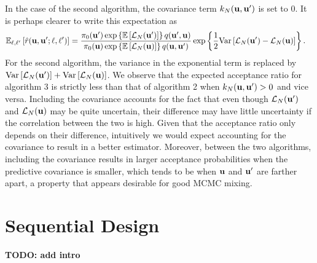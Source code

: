 \documentclass[12pt]{article}
\begin{document}
In the case of the second algorithm, the covariance term $\GPKerPred[\Ndesign](\bpar, \bpar^\prime)$ is set to $0$. It is perhaps clearer to write this expectation as 
\begin{align*}
\E_{\ell, \ell^\prime}\left[\hat{r}(\bpar, \bpar^\prime; \ell, \ell^\prime)\right]
&= \frac{\priorDens(\bpar^\prime)\exp\left\{\E\left[\llik_{\Ndesign}(\bpar^\prime)\right] \right\} \propDens(\bpar^\prime, \bpar)}{\priorDens(\bpar) \exp\left\{\E\left[\llik_{\Ndesign}(\bpar)\right]\right\} \propDens(\bpar, \bpar^\prime)}
\exp\left\{\frac{1}{2}\Var\left[\llik_{\Ndesign}(\bpar^\prime) -  \llik_{\Ndesign}(\bpar) \right] \right\}.
\end{align*}
For the second algorithm, the variance in the exponential term is replaced by $\Var\left[\llik_{\Ndesign}(\bpar^\prime)\right] + \Var\left[\llik_{\Ndesign}(\bpar)\right]$. We observe 
that the expected acceptance ratio for algorithm 3 is strictly less than that of algorithm 2 when $\GPKerPred[\Ndesign](\bpar, \bpar^\prime) > 0$ and vice versa. Including the covariance 
accounts for the fact that even though $\llik_{\Ndesign}(\bpar^\prime)$ and $\llik_{\Ndesign}(\bpar)$ may be quite uncertain, their difference may have little uncertainty 
if the correlation between the two is high. Given that the acceptance ratio only depends on their difference, intuitively we would expect accounting for the covariance to result 
in a better estimator. Moreover, between the two algorithms, including the covariance results in larger acceptance probabilities when the predictive covariance is smaller, which tends 
to be when $\bpar$ and $\bpar^\prime$ are farther apart, a property that appears desirable for good MCMC mixing.  

\section{Sequential Design}
\textbf{TODO: add intro}
\end{document}
